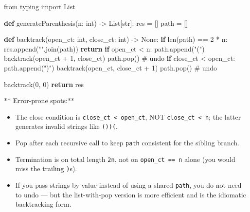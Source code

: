 \documentclass[11pt]{article}
\providecommand{\tightlist}{\setlength{\itemsep}{1pt}\setlength{\parskip}{0pt}}
\newenvironment{Shaded}{\begin{snugshade}}{\end{snugshade}}
\newcommand{\BuiltInTok}[1]{\textcolor[rgb]{0.50,0.55,0.55}{#1}}
\newcommand{\CommentTok}[1]{\textcolor[rgb]{0.48,0.49,0.49}{#1}}
\newcommand{\ControlFlowTok}[1]{\textcolor[rgb]{0.99,0.74,0.29}{\textbf{#1}}}
\newcommand{\DecValTok}[1]{\textcolor[rgb]{0.96,0.45,0.00}{#1}}
\newcommand{\ImportTok}[1]{\textcolor[rgb]{0.15,0.68,0.38}{#1}}
\newcommand{\KeywordTok}[1]{\textcolor[rgb]{0.81,0.81,0.76}{\textbf{#1}}}
\newcommand{\NormalTok}[1]{\textcolor[rgb]{0.81,0.81,0.76}{#1}}
\newcommand{\OperatorTok}[1]{\textcolor[rgb]{0.81,0.81,0.76}{#1}}
\newcommand{\StringTok}[1]{\textcolor[rgb]{0.96,0.31,0.31}{#1}}
\newcommand{\VariableTok}[1]{\textcolor[rgb]{0.15,0.68,0.68}{#1}}
\begin{document}
\begin{Shaded}
\begin{Highlighting}[]
\ImportTok{from}\NormalTok{ typing }\ImportTok{import}\NormalTok{ List}

\KeywordTok{def}\NormalTok{ generateParenthesis(n: }\BuiltInTok{int}\NormalTok{) }\OperatorTok{{-}\textgreater{}}\NormalTok{ List[}\BuiltInTok{str}\NormalTok{]:}
\NormalTok{    res }\OperatorTok{=}\NormalTok{ []}
\NormalTok{    path }\OperatorTok{=}\NormalTok{ []}

    \KeywordTok{def}\NormalTok{ backtrack(open\_ct: }\BuiltInTok{int}\NormalTok{, close\_ct: }\BuiltInTok{int}\NormalTok{) }\OperatorTok{{-}\textgreater{}} \VariableTok{None}\NormalTok{:}
        \ControlFlowTok{if} \BuiltInTok{len}\NormalTok{(path) }\OperatorTok{==} \DecValTok{2} \OperatorTok{*}\NormalTok{ n:}
\NormalTok{            res.append(}\StringTok{""}\NormalTok{.join(path))}
            \ControlFlowTok{return}
        \ControlFlowTok{if}\NormalTok{ open\_ct }\OperatorTok{\textless{}}\NormalTok{ n:}
\NormalTok{            path.append(}\StringTok{"("}\NormalTok{)}
\NormalTok{            backtrack(open\_ct }\OperatorTok{+} \DecValTok{1}\NormalTok{, close\_ct)}
\NormalTok{            path.pop()                       }\CommentTok{\# undo}
        \ControlFlowTok{if}\NormalTok{ close\_ct }\OperatorTok{\textless{}}\NormalTok{ open\_ct:}
\NormalTok{            path.append(}\StringTok{")"}\NormalTok{)}
\NormalTok{            backtrack(open\_ct, close\_ct }\OperatorTok{+} \DecValTok{1}\NormalTok{)}
\NormalTok{            path.pop()                       }\CommentTok{\# undo}

\NormalTok{    backtrack(}\DecValTok{0}\NormalTok{, }\DecValTok{0}\NormalTok{)}
    \ControlFlowTok{return}\NormalTok{ res}
\end{Highlighting}
\end{Shaded}

** Error-prone spots:**

\begin{itemize}
\tightlist
\item
  The close condition is \texttt{close\_ct\ \textless{}\ open\_ct}, NOT \texttt{close\_ct\ \textless{}\ n}; the latter generates invalid strings like \texttt{())(}.
\item
  Pop after each recursive call to keep \texttt{path} consistent for the sibling branch.
\item
  Termination is on total length \texttt{2n}, not on \texttt{open\_ct\ ==\ n} alone (you would miss the trailing \texttt{)}s).
\item
  If you pass strings by value instead of using a shared \texttt{path}, you do not need to undo --- but the list-with-pop version is more efficient and is the idiomatic backtracking form.
\end{itemize}
\end{document}
